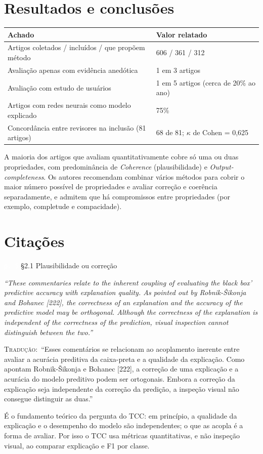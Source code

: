 \documentclass[11pt,a4paper]{article}
\newcommand{\pagechip}[1]{{\setlength{\fboxsep}{1.5pt}\colorbox{cAcc}{\textcolor{white}{\scriptsize\texttt{#1}}}}}
\newenvironment{origquote}{\par\itshape\small}{\par}
\newenvironment{tradquote}{\par\small\textsc{Tradução:}\ }{\par}
\newcommand{\explab}[1]{\par\smallskip{\small\color{cAcc}\textbf{\MakeUppercase{#1}}}\par}
\begin{document}
\section{Resultados e conclusões}
\begin{center}
\small
\begin{tabularx}{\linewidth}{Xl}
\toprule
Achado & Valor relatado \\
\midrule
Artigos coletados / incluídos / que propõem método & 606 / 361 / 312 \\
Avaliação apenas com evidência anedótica & 1 em 3 artigos \\
Avaliação com estudo de usuários & 1 em 5 artigos (cerca de 20\% ao ano) \\
Artigos com redes neurais como modelo explicado & 75\% \\
Concordância entre revisores na inclusão (81 artigos) & 68 de 81; $\kappa$ de Cohen = 0,625 \\
\bottomrule
\end{tabularx}
\end{center}
A maioria dos artigos que avaliam quantitativamente cobre só uma ou duas propriedades, com predominância de \textit{Coherence} (plausibilidade) e \textit{Output-completeness}. Os autores recomendam combinar vários métodos para cobrir o maior número possível de propriedades e avaliar correção e coerência separadamente, e admitem que há compromissos entre propriedades (por exemplo, completude e compacidade).

\section{Citações}

\begin{citacard}{\pagechip{p. 5} §2.1 Plausibilidade ou correção}
\begin{origquote}“These commentaries relate to the inherent coupling of evaluating the black box’ predictive accuracy with explanation quality. As pointed out by Robnik-Šikonja and Bohanec [222], the correctness of an explanation and the accuracy of the predictive model may be orthogonal. Although the correctness of the explanation is independent of the correctness of the prediction, visual inspection cannot distinguish between the two.”\end{origquote}
\begin{tradquote}“Esses comentários se relacionam ao acoplamento inerente entre avaliar a acurácia preditiva da caixa-preta e a qualidade da explicação. Como apontam Robnik-Šikonja e Bohanec [222], a correção de uma explicação e a acurácia do modelo preditivo podem ser ortogonais. Embora a correção da explicação seja independente da correção da predição, a inspeção visual não consegue distinguir as duas.”\end{tradquote}
\explab{Explicação}
É o fundamento teórico da pergunta do TCC: em princípio, a qualidade da explicação e o desempenho do modelo são independentes; o que as acopla é a forma de avaliar. Por isso o TCC usa métricas quantitativas, e não inspeção visual, ao comparar explicação e F1 por classe.
\end{citacard}
\end{document}
